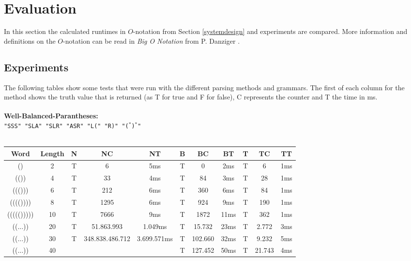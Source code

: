 \documentclass[a4paper, 11pt]{article}
\begin{document}

\pagebreak













\section{Evaluation}
\label{evaluation}

In this section the calculated runtimes in $O$-notation from Section \ref{systemdesign} and experiments are compared. More information and definitions on the $O$-notation can be read in \textit{Big O Notation} from P. Danziger \cite{bigO}.


\subsection{Experiments}
\label{experiments}

The following tables show some tests that were run with the different parsing methods and grammars. The first of each column for the method shows the truth value that is returned (as T for true and F for false), C represents the counter and T the time in ms.
\\
\\
\textbf{Well-Balanced-Parantheses:} \\
\texttt{"SSS" "SLA" "SLR" "ASR" "L(" "R)" "($^*$)$^*$"}
\ \\ \\
\begin{small}
\begin{tabular}{|c|c||c|c|c||c|c|c||c|c|c|}
\hline
Word & Length & N & NC & NT & B & BC & BT & T & TC & TT \\
\hline
\hline
() & 2 & T & 6 & 5ms & T & 0 & 2ms & T & 6 & 1ms \\
\hline
(()) & 4 & T & 33 & 4ms & T & 84 & 3ms & T & 28 & 1ms \\
\hline
((())) & 6 & T & 212 & 6ms & T & 360 & 6ms & T & 84 & 1ms \\
\hline
(((()))) & 8 & T & 1295 & 6ms & T & 924 & 9ms & T & 190 & 1ms \\
\hline
((((())))) & 10 & T & 7666 & 9ms & T & 1872 & 11ms & T & 362 & 1ms \\
\hline
((...)) & 20 & T & 51.863.993 & 1.049ms & T & 15.732 & 23ms & T & 2.772 & 3ms \\
\hline
((...)) & 30 & T & 348.838.486.712 & 3.699.571ms & T & 102.660 & 32ms & T & 9.232 & 5ms \\
\hline
((...)) & 40 & & & & T & 127.452 & 50ms & T & 21.743 & 4ms \\
\hline
\end{tabular}
\end{small}
\end{document}
